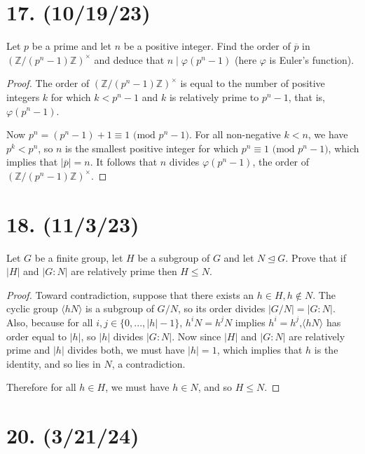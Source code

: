 \documentclass{article}
\begin{document}
\section*{17. (10/19/23)}

Let $p$ be a prime and let $n$ be a positive integer. Find the order of $\overline{p}$ in \\ $(\mathbb{Z}/(p^n - 1)\mathbb{Z})^\times$ and deduce that $n \mid \varphi(p^n - 1)$ (here $\varphi$ is Euler's function).

\begin{proof}
    The order of $(\mathbb{Z}/(p^n - 1)\mathbb{Z})^\times$ is equal to the number of positive integers $k$ for which $k < p^n - 1$ and $k$ is relatively prime to $p^n - 1$, that is, $\varphi(p^n - 1)$.

    Now $p^n = (p^n - 1) + 1 \equiv 1 \text{ (mod $p^n - 1$)}$. For all non-negative $k < n$, we have $p^k < p^n$, so $n$ is the smallest positive integer for which $p^n \equiv 1 \text{ (mod $p^n - 1$)}$, which implies that $|\overline{p}| = n$. It follows that $n$ divides $\varphi(p^n - 1)$, the order of $(\mathbb{Z}/(p^n - 1)\mathbb{Z})^\times$.
\end{proof}

\section*{18. (11/3/23)}

Let $G$ be a finite group, let $H$ be a subgroup of $G$ and let $N \unlhd G$. Prove that if $|H|$ and $|G:N|$ are relatively prime then $H \leq N$.

\begin{proof}
    Toward contradiction, suppose that there exists an $h \in H, h \notin N$. The cyclic group $\langle hN \rangle$ is a subgroup of $G/N$, so its order divides $|G/N| = |G:N|$. Also, because for all $i, j \in \{ 0, ..., |h| - 1 \}$, $h^i N = h^j N$ implies $h^i = h^j$,$\langle hN \rangle$ has order equal to $|h|$, so $|h|$ divides $|G:N|$. Now since $|H|$ and $|G:N|$ are relatively prime and $|h|$ divides both, we must have $|h| = 1$, which implies that $h$ is the identity, and so lies in $N$, a contradiction.

    Therefore for all $h \in H$, we must have $h \in N$, and so $H \leq N$.
\end{proof}

\section*{20. (3/21/24)}
\end{document}
